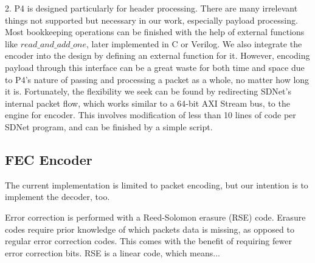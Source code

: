 2. P4 is designed particularly for header processing. There are many
irrelevant  things not supported but
necessary in our work, especially payload processing. Most bookkeeping operations can be finished with the
help of external functions like $read\_and\_add\_one$, later implemented in C or Verilog. We also integrate the encoder
into the design by defining an external function for it. However, encoding payload through this interface can be a
great waste for both time and space due to P4's nature of passing and processing a packet as a whole, no matter how long it is. Fortunately, the
flexibility we seek can be found by redirecting SDNet's internal packet flow, which works similar to a 64-bit AXI Stream bus,
to the engine for encoder. This involves modification of less than 10 lines of code per SDNet program, and can be finished by a simple script.

\subsection{FEC Encoder}

The current implementation is limited to packet encoding, but our intention is
to implement the decoder, too.

Error correction is performed with a Reed-Solomon erasure (RSE) code.  Erasure codes
require prior knowledge of which packets data is missing, as opposed to regular
error correction codes.  This comes with the benefit of requiring fewer error
correction bits.  RSE is a linear code, which means...

